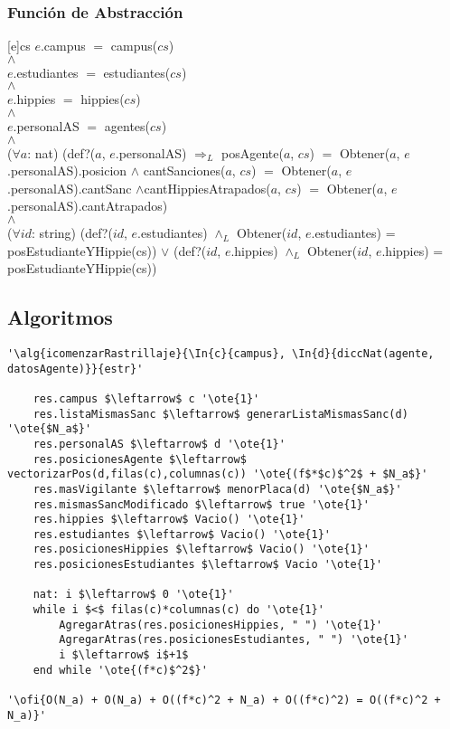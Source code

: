 \pagebreak

\subsubsection{Función de Abstracción}
[e]{cs}{
$e$.campus $=$ campus($cs$)
\\
$\land$
\\
$e$.estudiantes $=$ estudiantes($cs$)
\\
$\land$
\\
$e$.hippies $=$ hippies($cs$)
\\
$\land$
\\
$e$.personalAS $=$ agentes($cs$)
\\
$\land$
\\
($\forall a$: nat) (def?($a$, $e$.personalAS) $\Rightarrow_L$ posAgente($a$, $cs$) $=$ Obtener($a$, $e$.personalAS).posicion $\land$ cantSanciones($a$, $cs$) $=$ Obtener($a$, $e$.personalAS).cantSanc $\land$cantHippiesAtrapados($a$, $cs$) $=$ Obtener($a$, $e$.personalAS).cantAtrapados)
\\
$\land$
\\
($\forall id$: string) (def?($id$, $e$.estudiantes) $\land_L$ Obtener($id$, $e$.estudiantes) = posEstudianteYHippie(cs)) $\lor$ (def?($id$, $e$.hippies) $\land_L$ Obtener($id$, $e$.hippies) = posEstudianteYHippie(cs))
}

\subsection{Algoritmos}

\lstset{style=alg}

\begin{lstlisting}[mathescape]
'\alg{icomenzarRastrillaje}{\In{c}{campus}, \In{d}{diccNat(agente, datosAgente)}}{estr}'

	res.campus $\leftarrow$ c '\ote{1}'
	res.listaMismasSanc $\leftarrow$ generarListaMismasSanc(d) '\ote{$N_a$}'
	res.personalAS $\leftarrow$ d '\ote{1}'
	res.posicionesAgente $\leftarrow$ vectorizarPos(d,filas(c),columnas(c)) '\ote{(f$*$c)$^2$ + $N_a$}'
	res.masVigilante $\leftarrow$ menorPlaca(d) '\ote{$N_a$}'
	res.mismasSancModificado $\leftarrow$ true '\ote{1}'
	res.hippies $\leftarrow$ Vacio() '\ote{1}'
	res.estudiantes $\leftarrow$ Vacio() '\ote{1}'
	res.posicionesHippies $\leftarrow$ Vacio() '\ote{1}'
	res.posicionesEstudiantes $\leftarrow$ Vacio '\ote{1}'
	
	nat: i $\leftarrow$ 0 '\ote{1}'
	while i $<$ filas(c)*columnas(c) do '\ote{1}'
		AgregarAtras(res.posicionesHippies, " ") '\ote{1}'
		AgregarAtras(res.posicionesEstudiantes, " ") '\ote{1}'
		i $\leftarrow$ i$+1$
	end while '\ote{(f*c)$^2$}'

'\ofi{O(N_a) + O(N_a) + O((f*c)^2 + N_a) + O((f*c)^2) = O((f*c)^2 + N_a)}'
\end{lstlisting}


